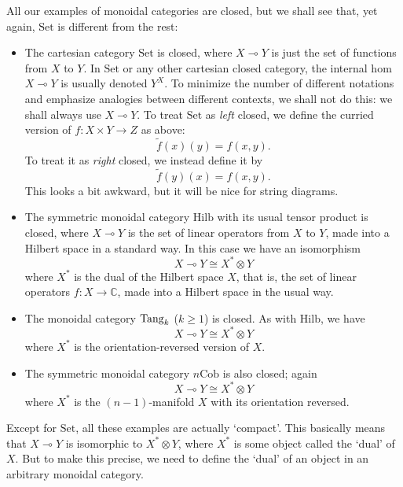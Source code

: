\documentclass[12pt]{article}
\newcommand{\Cob}{\mathrm{Cob}}
\newcommand{\Hilb}{\mathrm{Hilb}}
\newcommand{\Set}{\mathrm{Set}}
\newcommand{\Tang}{{\rm Tang}}
\newcommand{\maps}{\colon}
\newcommand{\iso}{\cong}
\newcommand{\lhom}{\multimap}
\newcommand{\tensor}{\otimes}
\begin{document}
All our examples of monoidal categories are closed, but we shall see 
that, yet again, $\Set$ is different from the rest:

\begin{itemize}
\item The cartesian category $\Set$ is closed, where 
$X \lhom Y$ is just the set of functions from $X$ to $Y$.
In $\Set$ or any other cartesian closed category, 
the internal hom $X \lhom Y$ is usually denoted $Y^X$.
To minimize the number of different notations and emphasize
analogies between different contexts, we shall not do this:
we shall always use $X \lhom Y$.  To treat $\Set$ as {\it left}
closed, we define the curried version of $f \maps X \times Y \to Z$
as above:
\[        \tilde{f}(x)(y) = f(x,y)  .\]
To treat it as {\it right} closed, we instead define it by
\[        \tilde{f}(y)(x) = f(x,y)  .\]
This looks a bit awkward, but it will be nice for string diagrams.
\item The symmetric monoidal category $\Hilb$ with its usual tensor product 
is closed, where $X \lhom Y$ is the set of linear operators
from $X$ to $Y$, made into a Hilbert space in a standard way.  In 
this case we have an isomorphism
\[        X \lhom Y \iso X^* \tensor Y \]
where $X^*$ is the dual of the Hilbert space $X$, that is, the
set of linear operators $f \maps X \to \mathbb{C}$, made into
a Hilbert space in the usual way.  
\item The monoidal category $\Tang_k$ ($k \ge 1$) is closed.
As with $\Hilb$, we have
\[        X \lhom Y \iso X^* \tensor Y \]
where $X^*$ is the orientation-reversed version of $X$.
\item The symmetric monoidal category $n\Cob$ is also closed;
again
\[        X \lhom Y \iso X^* \tensor Y \]
where $X^*$ is the $(n-1)$-manifold $X$ with its orientation
reversed.
\end{itemize}

Except for $\Set$, all these examples are actually `compact'.  This
basically means that $X \lhom Y$ is isomorphic to $X^* \tensor Y$, where
$X^*$ is some object called the `dual' of $X$.  But to make this
precise, we need to define the `dual' of an object in an arbitrary 
monoidal category.
\end{document}
